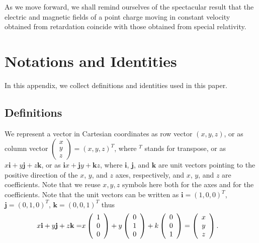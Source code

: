 \documentclass[11pt]{article}              %
\begin{document}
As we move forward, we shall remind ourselves of the spectacular result that the electric and magnetic fields of a point charge moving in constant velocity obtained from retardation coincide with those obtained from special relativity. 

\appendix
\section{Notations and Identities}
\renewcommand{\theequation}{A.\arabic{equation}}
\setcounter{equation}{0}
In this appendix, we collect definitions and identities used in this paper. 

\subsection*{Definitions} 
We represent a vector in Cartesian coordinates as row vector $(x,y,z)$, or as column vector $\left(\begin{array}{c}x\\y\\z\end{array}\right)=(x,y,z)^T$, where $^T$ stands for transpose, or as $x{\mathbf i}+y{\mathbf j}+z{\mathbf k}$, or as ${\mathbf i}x+{\mathbf j}y+{\mathbf k}z$, where ${\mathbf i}$, ${\mathbf j}$, and ${\mathbf k}$ are unit vectors pointing to the positive direction of the $x$, $y$, and $z$ axes, respectively, and $x$, $y$, and $z$ are coefficients. Note that we reuse $x,y,z$ symbols here both for the axes and for the coefficients. Note that the unit vectors can be written as ${\mathbf i}=(1,0,0)^T$, ${\mathbf j}=(0,1,0)^T$, ${\mathbf k}=(0,0,1)^T$ thus
\begin{align}
    x{\mathbf i}+y{\mathbf j}+z{\mathbf k}=&x\left(\begin{array}{c}1\\0\\0\end{array}\right)+y\left(\begin{array}{c}0\\1\\0\end{array}\right)+k\left(\begin{array}{c}0\\0\\1\end{array}\right)=\left(\begin{array}{c}x\\y\\z\end{array}\right).\notag
\end{align}
\end{document}
